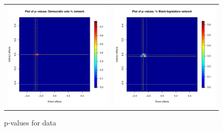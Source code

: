 \documentclass[12pt]{article}
\begin{document}
\begin{figure}
	\centering
	\begin{tabular}{cc}
	\includegraphics[scale=0.45]{./images/pval_plot_broockman_demvotepct.pdf} &
	\includegraphics[scale=0.45]{./images/pval_plot_broockman_blackpct.pdf} \\ 
	\end{tabular}
	\caption{p-values for \citet{broockman2013black} data}
\end{figure}
\end{document}
